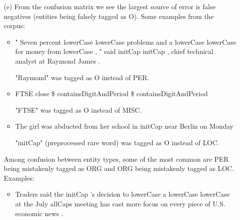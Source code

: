 \documentclass{article}
\begin{document}
\begin{itemize}
    Viterbi decoding output:

    \begin{verbatim}
        Token-level confusion matrix:
go\gu   	PER     	ORG     	LOC     	MISC    	O       
PER     	2779.00 	54.00   	69.00   	22.00   	225.00  
ORG     	109.00  	1615.00 	78.00   	43.00   	247.00  
LOC     	41.00   	100.00  	1730.00 	27.00   	196.00  
MISC    	39.00   	36.00   	25.00   	1009.00 	159.00  
O       	53.00   	90.00   	42.00   	63.00   	42511.00

Token-level scores:
label	acc  	prec 	rec  	f1   
PER  	0.99 	0.92 	0.88 	0.90 
ORG  	0.99 	0.85 	0.77 	0.81 
LOC  	0.99 	0.89 	0.83 	0.86 
MISC 	0.99 	0.87 	0.80 	0.83 
O    	0.98 	0.98 	0.99 	0.99 
micro	0.99 	0.97 	0.97 	0.97 
macro	0.99 	0.90 	0.85 	0.88 
not-O	0.99 	0.89 	0.83 	0.86 

Entity level P/R/F1: 0.87/0.83/0.85

    \end{verbatim}

    \item[(e)] 
    From the confusion matrix we see the largest source of error is false negatives (entities being falsely tagged as O). Some examples from the corpus:
    
    \begin{itemize}
    \item " Seven percent lowerCase lowerCase problems and a lowerCase lowerCase for money from lowerCase , " said initCap initCap , chief technical analyst at Raymond James .

    "Raymond" was tagged as O instead of PER.

    \item FTSE close \$ containsDigitAndPeriod \$ containsDigitAndPeriod

    "FTSE" was tagged as O instead of MISC.

    \item The girl was abducted from her school in initCap near Berlin on Monday
    
    "initCap" (preprocessed rare word) was tagged as O instead of LOC.

    \end{itemize}
    
    Among confusion between entity types, some of the most common are PER being mistakenly tagged as ORG and ORG being mistakenly tagged as LOC. Examples:

    \begin{itemize}
        \item Traders said the initCap 's decision to lowerCase a lowerCase lowerCase at the July allCaps meeting has cast more focus on every piece of U.S. economic news .
        

\end{itemize}
\end{itemize}
\end{document}
